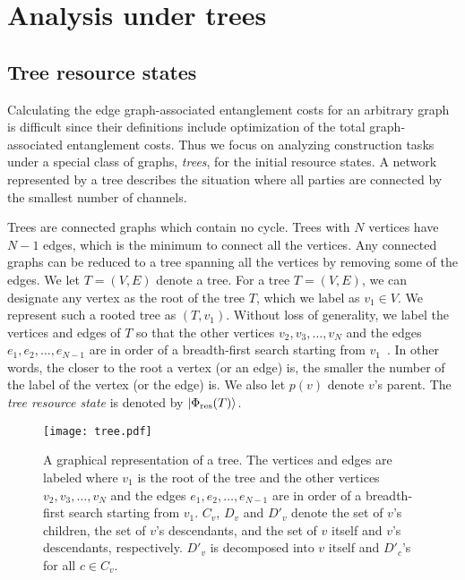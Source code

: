 \documentclass[preprintnumbers,aps,amsmath,amssymb,pra,twocolumn,showpacs,superscriptaddress,floatfix]{revtex4-1}
\def\Ket#1{\left|#1\right\rangle}
\theoremstyle{plain}
\theoremstyle{definition}
\theoremstyle{remark}
\begin{document}
\section{\label{sec:tree}Analysis under trees}
\subsection{Tree resource states}
Calculating the edge graph-associated entanglement costs for an arbitrary graph is difficult since their definitions include optimization of the total graph-associated entanglement costs.   Thus we focus on analyzing construction tasks under a special class of graphs, \textit{trees}, for the initial resource states.   A network represented by a tree describes the situation where all parties are connected by the smallest number of channels.  

Trees are connected graphs which contain no cycle.
Trees with $N$ vertices have $N-1$ edges, which is the minimum to connect all the vertices.
Any connected graphs can be reduced to a tree spanning all the vertices by removing some of the edges.
We let $T=(V,E)$ denote a tree. 
For a tree $T=(V,E)$,  we can designate any vertex as the root of the tree $T$, which we label as $v_1\in V$.
We represent such a rooted tree as $(T,v_1)$.
Without loss of generality, we label the vertices and edges of $T$ so that the other vertices $v_2, v_3,\ldots, v_N$ and the edges $e_1,e_2,\ldots,e_{N-1}$ are in order of a breadth-first search starting from $v_1$~\cite{RefWorks:142}.  In other words, the closer to the root a vertex (or an edge) is, the smaller the number of the label of the vertex (or the edge) is.
We also let $p(v)$ denote $v$'s parent. The \textit{tree resource state} is denoted by $\Ket{\Phi_{\textup{res}}(T)}$.

\begin{figure}
\centering
\texttt{[image: tree.pdf]}
\caption{A graphical representation of a tree.
    The vertices and edges are labeled where $v_1$ is the root of the tree and the other vertices $v_2, v_3,\ldots, v_N$ and the edges $e_1,e_2,\ldots,e_{N-1}$ are in order of a breadth-first search starting from $v_1$.   
  $C_v$, $D_{v}$ and $D'_v$ denote the set of $v$'s children, the set of $v$'s descendants, and the set of $v$ itself and $v$'s descendants, respectively. $D'_v$ is decomposed into $v$ itself and $D'_c$'s for all $c\in C_v$.
}
\label{fig:tree}
\end{figure}
\end{document}
